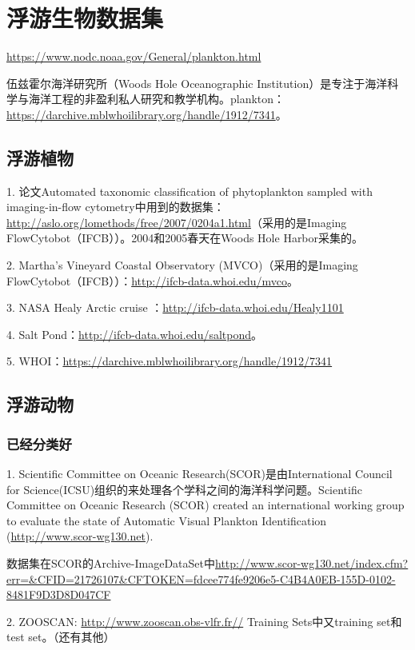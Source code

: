 \section{浮游生物数据集}
\url{https://www.nodc.noaa.gov/General/plankton.html}

伍兹霍尔海洋研究所（Woods Hole Oceanographic Institution）是专注于海洋科学与海洋工程的非盈利私人研究和教学机构。plankton：\url{https://darchive.mblwhoilibrary.org/handle/1912/7341}。

\subsection{浮游植物}

1. 论文Automated taxonomic classification of phytoplankton sampled with imaging-in-flow cytometry中用到的数据集：\url{http://aslo.org/lomethods/free/2007/0204a1.html}（采用的是Imaging FlowCytobot（IFCB））。2004和2005春天在Woods Hole Harbor采集的。

2. Martha’s Vineyard Coastal Observatory (MVCO)（采用的是Imaging FlowCytobot（IFCB））：\url{http://ifcb-data.whoi.edu/mvco}。

3. NASA Healy Arctic cruise ：\url{http://ifcb-data.whoi.edu/Healy1101}

4. Salt Pond：\url{http://ifcb-data.whoi.edu/saltpond}。

5. WHOI：\url{https://darchive.mblwhoilibrary.org/handle/1912/7341}


\subsection{浮游动物}

\subsubsection{已经分类好}
1. Scientific Committee on Oceanic Research(SCOR)是由International Council for Science(ICSU)组织的来处理各个学科之间的海洋科学问题。Scientific Committee on Oceanic Research (SCOR) created an international working group to evaluate the state of Automatic Visual Plankton Identification (\url{http://www.scor-wg130.net})\cite{gorsky2010digital}.

数据集在SCOR的Archive-ImageDataSet中\url{http://www.scor-wg130.net/index.cfm?err=&CFID=21726107&CFTOKEN=fdcee774fe9206e5-C4B4A0EB-155D-0102-8481F9D3D8D047CF}

2. ZOOSCAN: \url{http://www.zooscan.obs-vlfr.fr//} Training Sets中又training set和test set。（还有其他）



